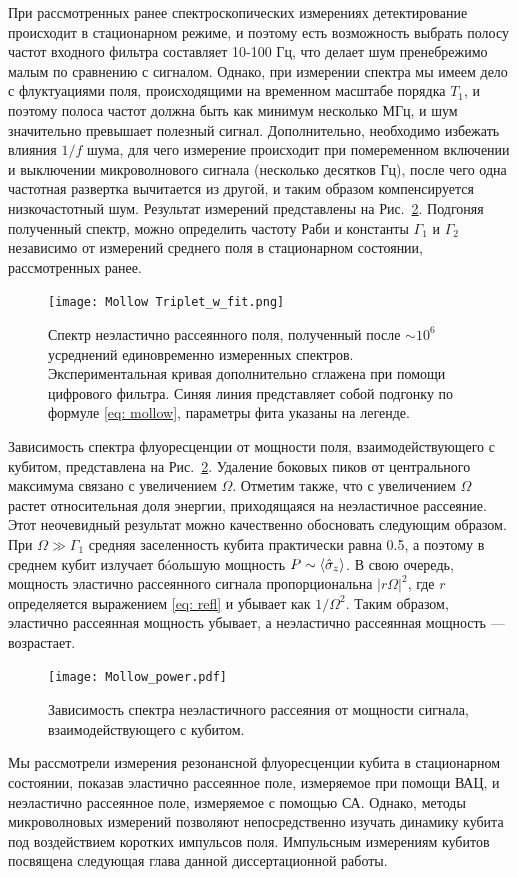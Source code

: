 При рассмотренных ранее спектроскопических измерениях детектирование происходит в стационарном режиме, и поэтому есть возможность выбрать полосу частот входного фильтра составляет 10-100 Гц, что делает шум пренебрежимо малым по сравнению с сигналом. Однако, при измерении спектра мы имеем дело с флуктуациями поля, происходящими на временном масштабе порядка $T_1$, и поэтому полоса частот должна быть как минимум несколько МГц, и шум значительно превышает полезный сигнал. Дополнительно, необходимо избежать влияния $1/f$ шума, для чего измерение происходит при помеременном включении и выключении микроволнового сигнала (несколько десятков Гц), после чего одна частотная развертка вычитается из другой, и таким образом компенсируется низкочастотный шум. Результат измерений представлены на Рис.~\ref{fig: Mollow_w_fit}. Подгоняя полученный спектр, можно определить частоту Раби и константы $\Gamma_1$ и $\Gamma_2$ независимо от измерений среднего поля в стационарном состоянии, рассмотренных ранее. 
\begin{figure}
	\centering
	\texttt{[image: Mollow Triplet\_w\_fit.png]}
	\caption[Спектр неэластично рассеянного поля на кубите.]{Спектр неэластично рассеянного поля, полученный после $\sim 10^6$ усреднений единовременно измеренных спектров. Экспериментальная кривая дополнительно сглажена при помощи цифрового фильтра. Синяя линия представляет собой подгонку по формуле \eqref{eq: mollow}, параметры фита указаны на легенде.}
	\label{fig: Mollow_w_fit}
\end{figure}

Зависимость спектра флуоресценции от мощности поля, взаимодействующего с кубитом, представлена на Рис.~\ref{fig: Mollow_w_fit}. Удаление боковых пиков от центрального максимума связано с увеличением $\Omega$. Отметим также, что с увеличением $\Omega$ растет относительная доля энергии, приходящаяся на неэластичное рассеяние. Этот неочевидный результат можно качественно обосновать следующим образом. При $\Omega \gg \Gamma_1$ средняя заселенность кубита практически равна 0.5, а поэтому в среднем кубит излучает б\'{o}ольшую мощность $P \sim \braket{\hat{\sigma}_z}$. В свою очередь, мощность эластично рассеянного сигнала пропорциональна $|r\Omega|^2$, где $r$ определяется выражением \eqref{eq: refl} и убывает как $1/\Omega^2$. Таким образом, эластично рассеянная мощность убывает, а неэластично рассеянная мощность --- возрастает. 

\begin{figure}[h]
	\centering
	\texttt{[image: Mollow\_power.pdf]}
	\caption[Зависимость триплета Моллоу от мощности драйва.]{Зависимость спектра неэластичного рассеяния от мощности сигнала, взаимодействующего с кубитом. }
	\label{fig: Mollow_w_fit}
\end{figure} 
Мы рассмотрели измерения резонансной флуоресценции кубита в стационарном состоянии, показав эластично рассеянное поле, измеряемое при помощи ВАЦ, и неэластично рассеянное поле, измеряемое с помощью СА. Однако, методы микроволновых измерений позволяют непосредственно изучать динамику кубита под воздействием коротких импульсов поля. Импульсным измерениям кубитов посвящена следующая глава данной диссертационной работы. 
